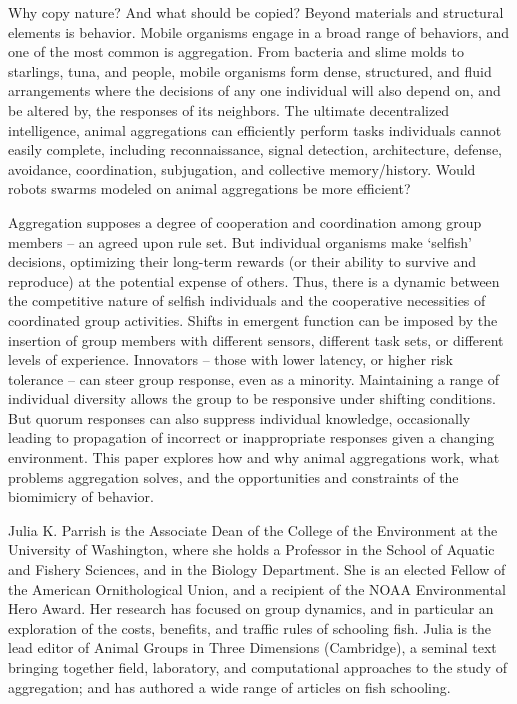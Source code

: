 {
Why copy nature? And what should be copied? Beyond materials and structural elements is behavior. Mobile organisms engage in a broad range of behaviors, and one of the most common is aggregation. From bacteria and slime molds to starlings, tuna, and people, mobile organisms form dense, structured, and fluid arrangements where the decisions of any one individual will also depend on, and be altered by, the responses of its neighbors. The ultimate decentralized intelligence, animal aggregations can efficiently perform tasks individuals cannot easily complete, including reconnaissance, signal detection, architecture, defense, avoidance, coordination, subjugation, and collective memory/history. Would robots swarms modeled on animal aggregations be more efficient?

Aggregation supposes a degree of cooperation and coordination among group members – an agreed upon rule set. But individual organisms make ‘selfish’ decisions, optimizing their long-term rewards (or their ability to survive and reproduce) at the potential expense of others. Thus, there is a dynamic between the competitive nature of selfish individuals and the cooperative necessities of coordinated group activities. Shifts in emergent function can be imposed by the insertion of group members with different sensors, different task sets, or different levels of experience. Innovators – those with lower latency, or higher risk tolerance – can steer group response, even as a minority. Maintaining a range of individual diversity allows the group to be responsive under shifting conditions. But quorum responses can also suppress individual knowledge, occasionally leading to propagation of incorrect or inappropriate responses given a changing environment. This paper explores how and why animal aggregations work, what 
problems aggregation solves, and the opportunities and constraints of the biomimicry of behavior.
}{
Julia K. Parrish is the Associate Dean of the College of the Environment at the University of Washington, where she holds a Professor in the School of Aquatic and Fishery Sciences, and in the Biology Department.  She is an elected Fellow of the American Ornithological Union, and a recipient of the NOAA Environmental Hero Award.  Her research has focused on group dynamics, and in particular an exploration of the costs, benefits, and traffic rules of schooling fish.  Julia is the lead editor of Animal Groups in Three Dimensions (Cambridge), a seminal text bringing together field, laboratory, and computational approaches to the study of aggregation; and has authored a wide range of articles on fish schooling.
}


